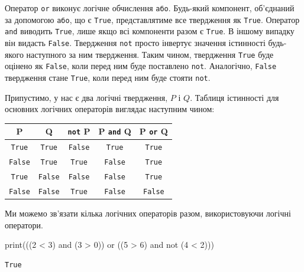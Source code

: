 \documentclass[
  letterpaper,
]{report}
\newenvironment{Shaded}{\begin{snugshade}}{\end{snugshade}}
\newcommand{\BuiltInTok}[1]{\textcolor[rgb]{0.00,0.23,0.31}{#1}}
\newcommand{\DecValTok}[1]{\textcolor[rgb]{0.68,0.00,0.00}{#1}}
\newcommand{\KeywordTok}[1]{\textcolor[rgb]{0.00,0.23,0.31}{#1}}
\newcommand{\NormalTok}[1]{\textcolor[rgb]{0.00,0.23,0.31}{#1}}
\newcommand{\OperatorTok}[1]{\textcolor[rgb]{0.37,0.37,0.37}{#1}}
\begin{document}
Оператор \texttt{or} виконує логічне обчислення \texttt{або}. Будь-який
компонент, об'єднаний за допомогою \texttt{або}, що є \texttt{True},
представлятиме все твердження як \texttt{True}. Оператор \texttt{and}
виводить \texttt{True}, лише якщо всі компоненти разом є \texttt{True}.
В іншому випадку він видасть \texttt{False}. Твердження \texttt{not}
просто інвертує значення істинності будь-якого наступного за ним
твердження. Таким чином, твердження \texttt{True} буде оцінено як
\texttt{False}, коли перед ним буде поставлено \texttt{not}. Аналогічно,
\texttt{False} твердження стане \texttt{True}, коли перед ним буде
стояти \texttt{not}.

Припустимо, у нас є два логічні твердження, \(P\) і \(Q\). Таблиця
істинності для основних логічних операторів виглядає наступним чином:

\begin{longtable}[]{@{}ccccc@{}}
\toprule\noalign{}
P & Q & \texttt{not} P & P \texttt{and} Q & P \texttt{or} Q \\
\midrule\noalign{}
\endhead
\bottomrule\noalign{}
\endlastfoot
\texttt{True} & \texttt{True} & \texttt{False} & \texttt{True} &
\texttt{True} \\
\texttt{False} & \texttt{True} & \texttt{True} & \texttt{False} &
\texttt{True} \\
\texttt{True} & \texttt{False} & \texttt{False} & \texttt{False} &
\texttt{True} \\
\texttt{False} & \texttt{False} & \texttt{True} & \texttt{False} &
\texttt{False} \\
\end{longtable}

Ми можемо зв'язати кілька логічних операторів разом, використовуючи
логічні оператори.

\begin{Shaded}
\begin{Highlighting}[]
\BuiltInTok{print}\NormalTok{(((}\DecValTok{2} \OperatorTok{\textless{}} \DecValTok{3}\NormalTok{) }\KeywordTok{and}\NormalTok{ (}\DecValTok{3} \OperatorTok{\textgreater{}} \DecValTok{0}\NormalTok{)) }\KeywordTok{or}\NormalTok{ ((}\DecValTok{5} \OperatorTok{\textgreater{}} \DecValTok{6}\NormalTok{) }\KeywordTok{and} \KeywordTok{not}\NormalTok{ (}\DecValTok{4} \OperatorTok{\textless{}} \DecValTok{2}\NormalTok{)))}
\end{Highlighting}
\end{Shaded}

\begin{verbatim}
True
\end{verbatim}
\end{document}
